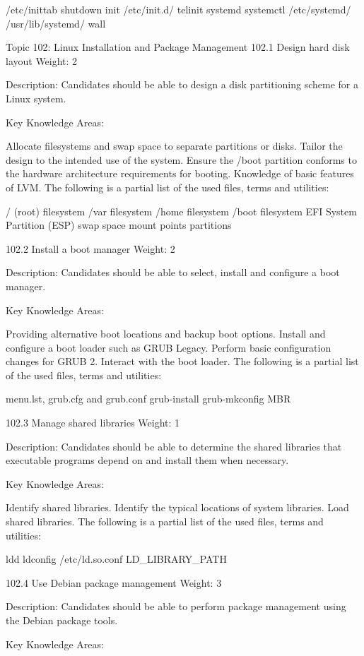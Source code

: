 /etc/inittab
shutdown
init
/etc/init.d/
telinit
systemd
systemctl
/etc/systemd/
/usr/lib/systemd/
wall
 

Topic 102: Linux Installation and Package Management
102.1 Design hard disk layout
Weight: 2

Description: Candidates should be able to design a disk partitioning scheme for a Linux system.

Key Knowledge Areas:

Allocate filesystems and swap space to separate partitions or disks.
Tailor the design to the intended use of the system.
Ensure the /boot partition conforms to the hardware architecture requirements for booting.
Knowledge of basic features of LVM.
The following is a partial list of the used files, terms and utilities:

/ (root) filesystem
/var filesystem
/home filesystem
/boot filesystem
EFI System Partition (ESP)
swap space
mount points
partitions
 
102.2 Install a boot manager
Weight: 2

Description: Candidates should be able to select, install and configure a boot manager.

Key Knowledge Areas:

Providing alternative boot locations and backup boot options.
Install and configure a boot loader such as GRUB Legacy.
Perform basic configuration changes for GRUB 2.
Interact with the boot loader.
The following is a partial list of the used files, terms and utilities:

menu.lst, grub.cfg and grub.conf
grub-install
grub-mkconfig
MBR
 

102.3 Manage shared libraries
Weight: 1

Description: Candidates should be able to determine the shared libraries that executable programs depend on and install them when necessary.

Key Knowledge Areas:

Identify shared libraries.
Identify the typical locations of system libraries.
Load shared libraries.
The following is a partial list of the used files, terms and utilities:

ldd
ldconfig
/etc/ld.so.conf
LD_LIBRARY_PATH
 

102.4 Use Debian package management
Weight: 3

Description: Candidates should be able to perform package management using the Debian package tools.

Key Knowledge Areas:

